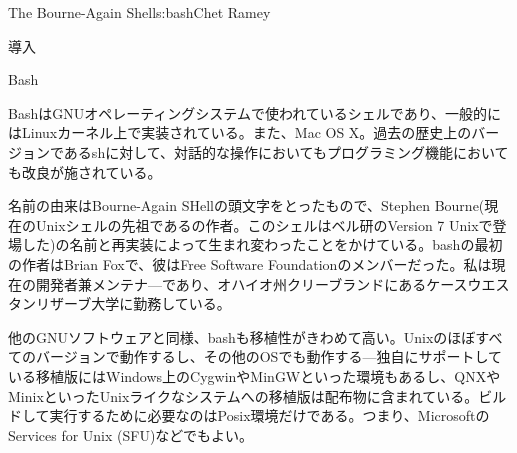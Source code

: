 \begin{aosachapter}{The Bourne-Again Shell}{s:bash}{Chet Ramey}
\begin{aosasect1}{導入}

\begin{aosasect2}{Bash}

BashはGNUオペレーティングシステムで使われているシェルであり、一般的にはLinuxカーネル上で実装されている。また、Mac OS X。過去の歴史上のバージョンであるshに対して、対話的な操作においてもプログラミング機能においても改良が施されている。

名前の由来はBourne-Again SHellの頭文字をとったもので、Stephen Bourne(現在のUnixシェルの先祖であるの作者。このシェルはベル研のVersion 7 Unixで登場した)の名前と再実装によって生まれ変わったことをかけている。bashの最初の作者はBrian Foxで、彼はFree Software Foundationのメンバーだった。私は現在の開発者兼メンテナ—であり、オハイオ州クリーブランドにあるケースウエスタンリザーブ大学に勤務している。

他のGNUソフトウェアと同様、bashも移植性がきわめて高い。Unixのほぼすべてのバージョンで動作するし、その他のOSでも動作する---独自にサポートしている移植版にはWindows上のCygwinやMinGWといった環境もあるし、QNXやMinixといったUnixライクなシステムへの移植版は配布物に含まれている。ビルドして実行するために必要なのはPosix環境だけである。つまり、MicrosoftのServices for Unix (SFU)などでもよい。


\end{aosasect2}
\end{aosasect1}
\end{aosachapter}
